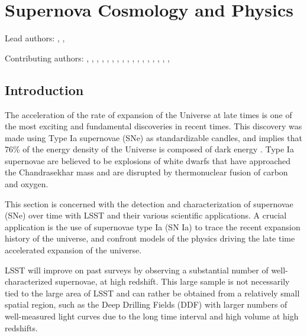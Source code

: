%
%
%
\clearpage
\section{Supernova Cosmology and Physics}
\def\secname{supernovae}\label{sec:\secname}

\newcommand{\ml}[1]{\textcolor{red}{[{\bf ML}: #1]}}

Lead authors:
,
,

Contributing authors:
,
,
,
,
,
,
,
,
,
,
,
,
,
,
,
,
,

\subsection{Introduction}
The acceleration of the rate of expansion of the Universe at late times is one of the
most exciting and fundamental discoveries\citep{Riess1998,Perlmutter1999} in recent times.
This discovery was made using Type Ia supernovae (SNe) as standardizable candles, and
implies that 76\% of the energy density of the Universe is composed of dark energy
\citep{Frieman2008}. Type Ia supernovae are believed to be explosions of white
dwarfs that have approached the Chandrasekhar mass and are disrupted by
thermonuclear fusion of carbon and oxygen.


This section is concerned with the detection and characterization of
supernovae (SNe) over time with LSST and their various scientific
applications. A crucial application is the use of supernovae type
Ia (SN Ia) %
to trace the recent expansion history of the universe, and confront models of the
physics driving the late time accelerated expansion of the universe.

LSST will improve on past surveys by observing a substantial number of well-characterized
supernovae, at high redshift. This large sample is not necessarily tied to the large area of LSST
and can rather be obtained from a relatively small spatial region, such as the Deep Drilling Fields
(DDF) with larger numbers of well-measured light curves due to the long time interval and high volume
at high redshifts.

